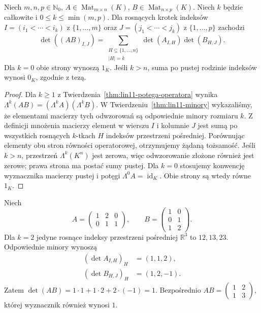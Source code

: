 \begin{wniosek}
\label{cor:lin11-cauchy-binet}
Niech \(m,n,p\in\mathbb N_0\),
\(A\in\operatorname{Mat}_{m\times n}(K)\),
\(B\in\operatorname{Mat}_{n\times p}(K)\).
Niech \(k\) będzie całkowite
i \(0\le k\le\min(m,p)\).
Dla rosnących krotek indeksów
\(I=(i_1<\cdots<i_k)\)
z \(\{1,\ldots,m\}\) oraz
\(J=(j_1<\cdots<j_k)\)
z \(\{1,\ldots,p\}\)
zachodzi
\[
 \det((AB)_{I,J})
 =\sum_{\substack{H\subseteq\{1,\ldots,n\}\\|H|=k}}
     \det(A_{I,H})\det(B_{H,J}).
\]
Dla \(k=0\) obie strony
wynoszą \(1_K\).
Jeśli \(k>n\), suma po
pustej rodzinie indeksów
wynosi \(0_K\), zgodnie z tezą.
\end{wniosek}
\begin{proof}
Dla \(k\ge1\) z
Twierdzenia~\ref{thm:lin11-potega-operatora}
wynika
\(\Lambda^k(AB)=(\Lambda^k A)(\Lambda^k B)\).
W
Twierdzeniu~\ref{thm:lin11-minory}
wykazaliśmy, że
elementami macierzy
tych odwzorowań są odpowiednie
minory rozmiaru \(k\).
Z definicji mnożenia
macierzy element w
wierszu \(I\) i kolumnie
\(J\) jest sumą po wszystkich
rosnących \(k\)-tkach \(H\)
indeksów przestrzeni pośredniej.
Porównując elementy obu
stron równości operatorowej,
otrzymujemy żądaną tożsamość.
Jeśli \(k>n\), przestrzeń
\(\Lambda^k(K^n)\) jest zerowa,
więc odwzorowanie złożone
również jest zerowe; prawa
strona ma postać sumy pustej.
Dla \(k=0\) stosujemy konwencję
wyznacznika macierzy pustej
i potęgi \(\Lambda^0 A=\operatorname{id}_K\).
Obie strony są wtedy równe \(1_K\).
\end{proof}

\begin{przyklad}
\label{prz:lin11-cauchy}
Niech
\[
 A=\begin{pmatrix}1&2&0\\0&1&1\end{pmatrix},
 \qquad
 B=\begin{pmatrix}1&0\\0&1\\1&2\end{pmatrix}.
\]
Dla \(k=2\) jedyne
rosnące indeksy przestrzeni
pośredniej \(\mathbb R^3\)
to \(12,13,23\).
Odpowiednie minory wynoszą
\[
 \begin{aligned}
 (\det A_{I,H})_H&=(1,1,2),\\
 (\det B_{H,J})_H&=(1,2,-1).
 \end{aligned}
\]
Zatem
\(\det(AB)=1\cdot1+1\cdot2+
2\cdot(-1)=1\).
Bezpośrednio
\(AB=\begin{pmatrix}1&2\\1&3\end{pmatrix}\),
której wyznacznik również
wynosi \(1\).
\end{przyklad}

